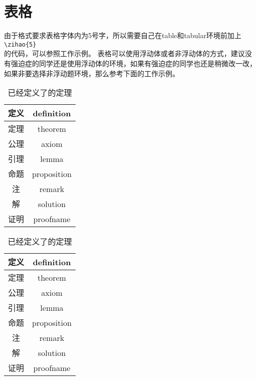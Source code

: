 \chapter{表格}

由于格式要求表格字体内为5号字，所以需要自己在table和tabular环境前加上 \verb|\zihao{5}| \\的代码，可以参照工作示例。
表格可以使用浮动体或者非浮动体的方式，建议没有强迫症的同学还是使用浮动体的环境，如果有强迫症的同学也还是稍微改一改，如果非要选择非浮动题环境，那么参考下面的工作示例。

\begin{tcode}
\begin{table}
	\centering
	\caption{已经定义了的定理}
	\begin{tabular}{|c|c|}
		\hline               
		定义      &   definition  \\   \hline 
		定理      &   theorem    \\   \hline
		公理      &   axiom		\\   \hline
		引理		&	lemma		\\   \hline
		命题	   &	proposition \\  \hline
		注		  &	  remark		\\  \hline
		解		  &	  solution   \\ \hline
		证明		&	proofname  \\ \hline
		
	\end{tabular}
\end{table}
\end{tcode}

\begin{table}
	\centering
	\caption{已经定义了的定理}
	\begin{tabular}{|c|c|}
		\hline               
		定义      &   definition  \\   \hline 
		定理      &   theorem    \\   \hline
		公理      &   axiom		\\   \hline
		引理		&	lemma		\\   \hline
		命题	   &	proposition \\  \hline
		注		  &	  remark		\\  \hline
		解		  &	  solution   \\ \hline
		证明		&	proofname  \\ \hline
	\end{tabular}
\end{table}


